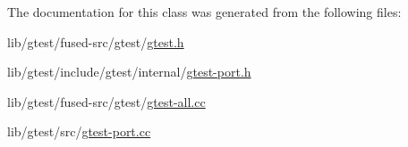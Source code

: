 The documentation for this class was generated from the following files\-:\begin{DoxyCompactItemize}
\item 
lib/gtest/fused-\/src/gtest/\hyperlink{fused-src_2gtest_2gtest_8h}{gtest.\-h}\item 
lib/gtest/include/gtest/internal/\hyperlink{gtest-port_8h}{gtest-\/port.\-h}\item 
lib/gtest/fused-\/src/gtest/\hyperlink{fused-src_2gtest_2gtest-all_8cc}{gtest-\/all.\-cc}\item 
lib/gtest/src/\hyperlink{gtest-port_8cc}{gtest-\/port.\-cc}\end{DoxyCompactItemize}

